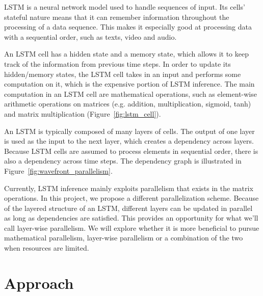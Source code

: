 \documentclass[12pt]{article}
\begin{document}
LSTM is a neural network model used to handle sequences of input. Its cells' stateful nature means that it can remember information throughout the processing of a data sequence. This makes it especially good at processing data with a sequential order, such as texts, video and audio.

An LSTM cell has a hidden state and a memory state, which allows it to keep track of the information from previous time steps.
In order to update its hidden/memory states, the LSTM cell takes in an input and performs some computation on it, which is the expensive portion of LSTM inference.
The main computation in an LSTM cell are mathematical operations, such as element-wise arithmetic operations on matrices (e.g. addition, multiplication, sigmoid, tanh) and matrix multiplication (Figure~\ref{fig:lstm_cell}).

An LSTM is typically composed of many layers of cells.
The output of one layer is used as the input to the next layer, which creates a dependency across layers.
Because LSTM cells are assumed to process elements in sequential order, there is also a dependency across time steps.
The dependency graph is illustrated in Figure~\ref{fig:wavefront_parallelism}.

Currently, LSTM inference mainly exploits parallelism that exists in the matrix operations. In this project, we propose a different parallelization scheme.
Because of the layered structure of an LSTM, different layers can be updated in parallel as long as dependencies are satisfied. This provides an opportunity for what we'll call layer-wise parallelism.
We will explore whether it is more beneficial to pursue mathematical parallelism, layer-wise parallelism or a combination of the two when resources are limited.



\section{Approach}
\end{document}
